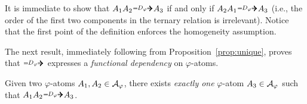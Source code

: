 %

It is immediate to show that $A_1A_2\genDphi A_3$ if and only if $A_2A_1\genDphi A_3$ (i.e., the order of the first two components in the ternary relation is irrelevant). 
Notice that the first point of the definition enforces the homogeneity assumption.

The next result, immediately following from Proposition~\ref{prop:unique}, proves that $\genDphi$ expresses a \emph{functional dependency} on $\varphi$-atoms.
%
\begin{lemma}\label{lem:functional}
Given two $\varphi$-atoms $A_1, A_2\in \mathcal{A}_{\varphi}$, there exists \emph{exactly one} $\varphi$-atom  $A_3\in \mathcal{A}_{\varphi}$  such that $A_1A_2\genDphi A_3$.
\end{lemma}
%

